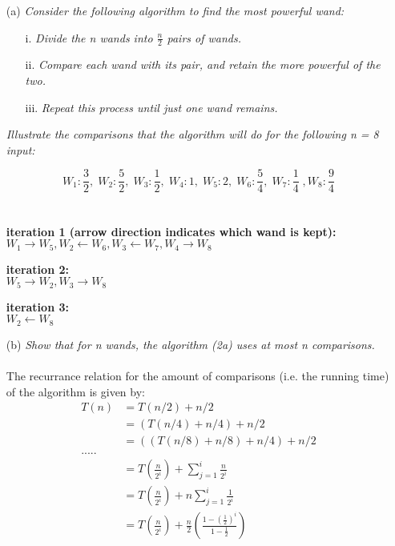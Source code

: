 \documentclass[11pt]{article} \setlength{\oddsidemargin}{0in}
\begin{document}
{  \begin{enumerate}
  \item[(a)]{\textit{Consider the following algorithm to find the most
        powerful wand:}}
    \begin{enumerate}
    \item[i.] \textit{Divide the n wands into $\frac{n}{2}$ pairs of
        wands.}
    \item[ii.] \textit{Compare each wand with its pair, and retain the
        more powerful of the two.}
    \item[iii.] \textit{Repeat this process until just one wand
        remains.}
    \end{enumerate}

    \textit{Illustrate the comparisons that the algorithm will do for
      the following n = 8 input:}

    $$
    W_1:\frac{3}{2},\; W_2:\frac{5}{2},\; W_3:\frac{1}{2},\; W_4:1,\;
    W_5:2,\; W_6:\frac{5}{4},\; W_7:\frac{1}{4}\;, W_8:\frac{9}{4}
    $$
    \\\\
    \textbf{iteration 1 (arrow direction indicates which wand is kept):} \\
    $W_1 \rightarrow W_5, W_2 \leftarrow W_6, W_3 \leftarrow W_7, W_4 \rightarrow W_8$ 

    \textbf{iteration 2:} \\
    $W_5 \rightarrow W_2, W_3 \rightarrow W_8$

    \textbf{iteration 3:} \\
    $W_2 \leftarrow W_8$

  \newpage
    
  \item[(b)]{\textit{Show that for n wands, the algorithm (2a) uses at
        most n comparisons.}}
    \\\\
    The recurrance relation for the amount of comparisons (i.e. the running time) of the algorithm is given by: 
    \begin{align}
    T(n) &= T(n/2) + n/2 \\
    &= (T(n/4) + n/4) + n/2 \\
    &= ((T(n/8) + n/8) + n/4) + n/2 \\
    ..... \\
    &= T(\frac{n}{2^i}) + \sum_{j=1}^{i} \frac{n}{2^i} \\
    &= T(\frac{n}{2^i}) + n\sum_{j=1}^{i} \frac{1}{2^i} \\
    &= T(\frac{n}{2^i}) + \frac{n}{2} (\frac{1 - (\frac{1}{2})^i}{1 - \frac{1}{2}}) 
    \end{align}


\end{enumerate}}
\end{document}
